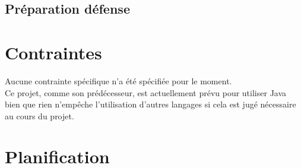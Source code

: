 \documentclass{article}
\begin{document}
  \subsection{Préparation défense}

\section{Contraintes}
  Aucune contrainte spécifique n'a été spécifiée pour le moment.\\
  Ce projet, comme son prédécesseur, est actuellement prévu pour utiliser Java bien que rien n'empêche l'utilisation d'autres langages si cela est jugé nécessaire au cours du projet.

\newpage
\section{Planification}
\end{document}
